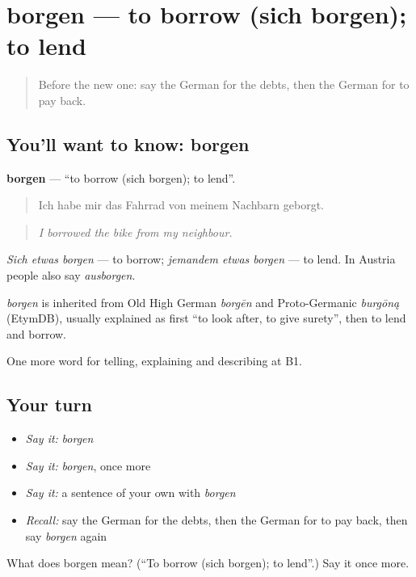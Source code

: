 \section[borgen]{borgen — to borrow (sich borgen); to lend}

\label{lesson:GE-C388-borgen}



\begin{quote}
Before the new one: say the German for the debts, then the German for to pay back.
\end{quote}

\subsection*{You'll want to know: borgen}
\textbf{borgen} — \textquotedblleft{}to borrow (sich borgen); to lend\textquotedblright{}.

\begin{quote}
Ich habe mir das Fahrrad von meinem Nachbarn geborgt.
\end{quote}

\begin{quote}
\emph{I borrowed the bike from my neighbour.}
\end{quote}

\emph{Sich etwas borgen} — to borrow; \emph{jemandem etwas borgen} — to lend. In Austria people also say \emph{ausborgen}.

\begin{cousinweb}
\emph{borgen} is inherited from Old High German \emph{borgēn} and Proto-Germanic \emph{burgōną} (EtymDB), usually explained as first \textquotedblleft{}to look after, to give surety\textquotedblright{}, then to lend and borrow.
\end{cousinweb}

\begin{grammarlens}[title={What you've built}]
One more word for telling, explaining and describing at B1.
\end{grammarlens}

\subsection*{Your turn}
\begin{itemize}
\raggedright
  \item \emph{Say it:} \emph{borgen}
  \item \emph{Say it:} \emph{borgen}, once more
  \item \emph{Say it:} a sentence of your own with \emph{borgen}
  \item \emph{Recall:} say the German for the debts, then the German for to pay back, then say \emph{borgen} again
\end{itemize}

\begin{tcolorbox}[breakable,colback=teal!4,colframe=teal!35!black,title={Before you move on}]
What does borgen mean? (\textquotedblleft{}To borrow (sich borgen); to lend\textquotedblright{}.) Say it once more.
\end{tcolorbox}
